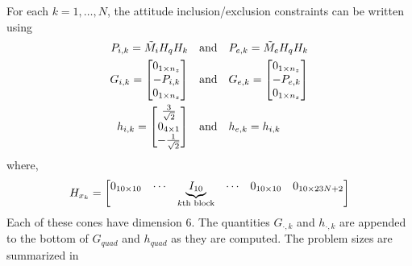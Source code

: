 \documentclass[10pt]{article}
\begin{document}
For each $k=1,\ldots,N$, the attitude inclusion/exclusion constraints can be written using 
\begin{align*}
P_{i,k} = \tilde{M}_i H_q H_k  \quad &\text{and} \quad P_{e,k} = \tilde{M}_e H_q H_k \\
G_{i,k} = \begin{bmatrix}
0_{1 \times n_z} \\ - P_{i,k} \\ 0_{1 \times n_z}
\end{bmatrix} \quad &\text{and} \quad G_{e,k} = \begin{bmatrix}
0_{1 \times n_z} \\ -P_{e,k} \\ 0_{1 \times n_z}
\end{bmatrix} \\
h_{i,k} = \begin{bmatrix}
\frac{3}{\sqrt{2}} \\ 0_{4 \times 1} \\ -\frac{1}{\sqrt{2}}
\end{bmatrix} \quad &\text{and} \quad h_{e,k} = h_{i,k}
\end{align*}
where,
\begin{equation*}
H_{x_k} = \begin{bmatrix}
0_{10 \times 10} & \cdots & \underbrace{I_{10}}_{k\text{th block}} & \cdots & 0_{10 \times 10} & 0_{10 \times 23N+2} \end{bmatrix}
\end{equation*}
Each of these cones have dimension 6. The quantities $G_{\cdot,k}$ and $h_{\cdot,k}$ are appended to the bottom of $G_{quad}$ and $h_{quad}$ as they are computed. The problem sizes are summarized in
\end{document}
